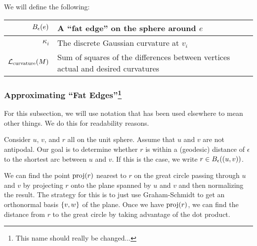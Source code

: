 We will define the following: \begin{center}\begin{tabular}{r|l}
	\(B_{\epsilon}\pof{e}\) & A ``fat edge'' on the sphere around \(e\) \\ \hline
	\(\kappa_i\) & The discrete Gaussian curvature at \(v_i\) \\ \hline
	\(\mathcal{L}_{\mathrm{curvature}}\pof{M}\) & Sum of squares of the differences between vertices actual and desired curvatures
\end{tabular}\end{center}

\subsubsection[Approximating "Fat Edges"]{Approximating ``Fat Edges''\footnote{This name should really be changed...}}
For this subsection, we will use notation that has been used elsewhere to mean other things. We do this for readability reasons.

Consider \(u\), \(v\), and \(r\) all on the unit sphere. Assume that \(u\) and \(v\) are not antipodal. Our goal is to determine whether \(r\) is within a (geodesic) distance of \(\epsilon\) to the shortest arc between \(u\) and \(v\). If this is the case, we write \(r \in B_\epsilon\pof{\pof{u, v}}\).

We can find the point \(\proj\pof{r}\) nearest to \(r\) on the great circle passing through \(u\) and \(v\) by projecting \(r\) onto the plane spanned by \(u\) and \(v\) and then normalizing the result. The strategy for this is to just use Graham-Schmidt to get an orthonormal basis \(\cof{v, w}\) of the plane. Once we have \(\proj\pof{r}\), we can find the distance from \(r\) to the great circle by taking advantage of the dot product.

